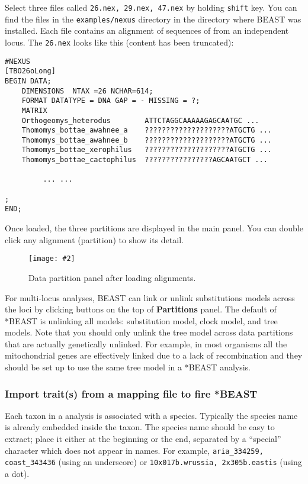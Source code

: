 \documentclass{article}
\newcommand{\includeimage}[2][]{%
\texttt{[image: \#2]}
}
\begin{document}
Select three files called \texttt{26.nex, 29.nex, 47.nex} by holding \texttt{shift} key. 
You can find the files in the {\tt examples/nexus} directory in the directory where BEAST was installed. 
Each file contains an alignment of sequences of from an independent locus. The \texttt{26.nex} looks like this (content has been truncated):

\begin{verbatim}
#NEXUS
[TBO26oLong]
BEGIN DATA;
	DIMENSIONS  NTAX =26 NCHAR=614;
	FORMAT DATATYPE = DNA GAP = - MISSING = ?;
	MATRIX	
	Orthogeomys_heterodus        ATTCTAGGCAAAAAGAGCAATGC ...
	Thomomys_bottae_awahnee_a    ????????????????????ATGCTG ...
	Thomomys_bottae_awahnee_b    ????????????????????ATGCTG ...
	Thomomys_bottae_xerophilus   ????????????????????ATGCTG ...
	Thomomys_bottae_cactophilus  ????????????????AGCAATGCT ...

         ... ...

;
END;
\end{verbatim}

\medskip{}

Once loaded, the three partitions are displayed in the main panel.
You can double click any alignment (partition) to show its detail.

\begin{figure}
\centering
\includeimage[scale=0.32,clip=true,trim=0 300 0 0]{figures/BEAUti_DataPartitions}

\caption{\label{fig.datapartition} Data partition panel after loading alignments.}
\end{figure}


For multi-locus analyses, BEAST can link or unlink substitutions models across the loci by clicking buttons on the top of {\bf Partitions} panel. The default of *BEAST is unlinking all models: substitution model, clock model, and tree models. Note that you should only unlink the tree model across data partitions that are actually genetically unlinked. For example, in most organisms all the mitochondrial genes are effectively linked due to a lack of recombination and they should be set up to use the same tree model in a *BEAST analysis. 

\subsubsection*{Import trait(s) from a mapping file to fire *BEAST}

Each taxon in a \mlstname{} analysis is associated with a species. Typically the
species name is already embedded inside the taxon. The species name should be
easy to extract; place it either at the beginning or the end, separated by a
``special'' character which does not appear in names. For example,
\texttt{aria\_334259, coast\_343436} (using an underscore) or
\texttt{10x017b.wrussia, 2x305b.eastis} (using a dot).
\end{document}
